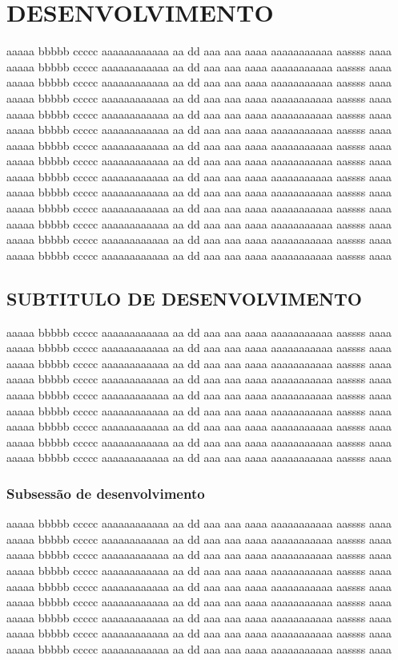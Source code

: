 \chapter{DESENVOLVIMENTO}
aaaaa bbbbb ccccc aaaaaaaaaaaa aa dd  aaa aaa aaaa aaaaaaaaaaa aassss aaaa 
aaaaa bbbbb ccccc aaaaaaaaaaaa aa dd  aaa aaa aaaa aaaaaaaaaaa aassss aaaa
aaaaa bbbbb ccccc aaaaaaaaaaaa aa dd  aaa aaa aaaa aaaaaaaaaaa aassss aaaa
aaaaa bbbbb ccccc aaaaaaaaaaaa aa dd  aaa aaa aaaa aaaaaaaaaaa aassss aaaa
aaaaa bbbbb ccccc aaaaaaaaaaaa aa dd  aaa aaa aaaa aaaaaaaaaaa aassss aaaa
aaaaa bbbbb ccccc aaaaaaaaaaaa aa dd  aaa aaa aaaa aaaaaaaaaaa aassss aaaa
aaaaa bbbbb ccccc aaaaaaaaaaaa aa dd  aaa aaa aaaa aaaaaaaaaaa aassss aaaa
aaaaa bbbbb ccccc aaaaaaaaaaaa aa dd  aaa aaa aaaa aaaaaaaaaaa aassss aaaa
aaaaa bbbbb ccccc aaaaaaaaaaaa aa dd  aaa aaa aaaa aaaaaaaaaaa aassss aaaa
aaaaa bbbbb ccccc aaaaaaaaaaaa aa dd  aaa aaa aaaa aaaaaaaaaaa aassss aaaa
aaaaa bbbbb ccccc aaaaaaaaaaaa aa dd  aaa aaa aaaa aaaaaaaaaaa aassss aaaa
aaaaa bbbbb ccccc aaaaaaaaaaaa aa dd  aaa aaa aaaa aaaaaaaaaaa aassss aaaa
aaaaa bbbbb ccccc aaaaaaaaaaaa aa dd  aaa aaa aaaa aaaaaaaaaaa aassss aaaa
aaaaa bbbbb ccccc aaaaaaaaaaaa aa dd  aaa aaa aaaa aaaaaaaaaaa aassss aaaa

\section{SUBTITULO DE DESENVOLVIMENTO}
aaaaa bbbbb ccccc aaaaaaaaaaaa aa dd  aaa aaa aaaa aaaaaaaaaaa aassss aaaa
aaaaa bbbbb ccccc aaaaaaaaaaaa aa dd  aaa aaa aaaa aaaaaaaaaaa aassss aaaa
aaaaa bbbbb ccccc aaaaaaaaaaaa aa dd  aaa aaa aaaa aaaaaaaaaaa aassss aaaa
aaaaa bbbbb ccccc aaaaaaaaaaaa aa dd  aaa aaa aaaa aaaaaaaaaaa aassss aaaa
aaaaa bbbbb ccccc aaaaaaaaaaaa aa dd  aaa aaa aaaa aaaaaaaaaaa aassss aaaa
aaaaa bbbbb ccccc aaaaaaaaaaaa aa dd  aaa aaa aaaa aaaaaaaaaaa aassss aaaa
aaaaa bbbbb ccccc aaaaaaaaaaaa aa dd  aaa aaa aaaa aaaaaaaaaaa aassss aaaa
aaaaa bbbbb ccccc aaaaaaaaaaaa aa dd  aaa aaa aaaa aaaaaaaaaaa aassss aaaa
aaaaa bbbbb ccccc aaaaaaaaaaaa aa dd  aaa aaa aaaa aaaaaaaaaaa aassss aaaa
\subsection{Subsessão de desenvolvimento}
aaaaa bbbbb ccccc aaaaaaaaaaaa aa dd  aaa aaa aaaa aaaaaaaaaaa aassss aaaa
aaaaa bbbbb ccccc aaaaaaaaaaaa aa dd  aaa aaa aaaa aaaaaaaaaaa aassss aaaa
aaaaa bbbbb ccccc aaaaaaaaaaaa aa dd  aaa aaa aaaa aaaaaaaaaaa aassss aaaa
aaaaa bbbbb ccccc aaaaaaaaaaaa aa dd  aaa aaa aaaa aaaaaaaaaaa aassss aaaa
aaaaa bbbbb ccccc aaaaaaaaaaaa aa dd  aaa aaa aaaa aaaaaaaaaaa aassss aaaa
aaaaa bbbbb ccccc aaaaaaaaaaaa aa dd  aaa aaa aaaa aaaaaaaaaaa aassss aaaa
aaaaa bbbbb ccccc aaaaaaaaaaaa aa dd  aaa aaa aaaa aaaaaaaaaaa aassss aaaa
aaaaa bbbbb ccccc aaaaaaaaaaaa aa dd  aaa aaa aaaa aaaaaaaaaaa aassss aaaa
aaaaa bbbbb ccccc aaaaaaaaaaaa aa dd  aaa aaa aaaa aaaaaaaaaaa aassss aaaa
